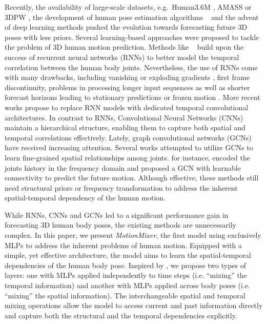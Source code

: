 \documentclass{article}
\begin{document}
Recently, the availability of large-scale datasets, e.g.~Human3.6M \cite{ionescu2013human3}, AMASS \cite{mahmood2019amass} or 3DPW \cite{von2018recovering}, the development of human pose estimation algorithms ~\cite{belagiannis2014holistic,bouazizi2021self} and the advent of deep learning methods pushed the evolution towards forecasting future 3D poses with less priors. Several learning-based approaches were proposed to tackle the problem of 3D human motion prediction. Methods like ~\cite{fragkiadaki2015recurrent,martinez2017human,tang2018long} build upon the success of recurrent neural networks (RNNs) to better model the temporal correlation between the human body joints. Nevertheless, the use of RNNs come with many drawbacks, including vanishing or exploding gradients \cite{fragkiadaki2015recurrent}, first frame discontinuity, problems in processing longer input sequences as well as shorter forecast horizons leading to stationary predictions or frozen motion \cite{martinez2017human}. More recent works \cite{li2018convolutional,sofianos2021space} propose to replace RNN models with dedicated temporal convolutional architectures. In contrast to RNNs, Convolutional Neural Networks (CNNs) maintain a hierarchical structure, enabling them to capture both spatial and temporal correlations effectively. Lately, graph convolutional networks (GCNs) have received increasing attention. Several works \cite{mao2019learning,mao2020history,sofianos2021space,liu2021motion} attempted to utilize GCNs to learn fine-grained spatial relationships among joints.  \cite{mao2019learning} for instance, encoded the joints history in the frequency domain and proposed a GCN with learnable connectivity to predict the future motion. Although effective, these methods still need structural priors \cite{aksan2020spatio} or frequency transformation \cite{mao2019learning} to address the inherent spatial-temporal dependency of the human motion.

While RNNs, CNNs and GCNs led to a significant performance gain in forecasting 3D human body poses, the existing methods are unnecessarily complex. In this paper, we present \textit{MotionMixer}, the first model using exclusively MLPs to address the inherent problems of human motion. Equipped with a simple, yet effective architecture, the model aims to learn the spatial-temporal dependencies of the human body pose. Inspired by \cite{tolstikhin2021mlp}, we propose two types of layers: one with MLPs applied independently to time steps (i.e. “mixing” the temporal information) and another with MLPs applied across body poses (i.e. “mixing” the spatial information). The interchangeable spatial and temporal mixing operations allow the model to access current and past information directly and capture both the structural and the temporal dependencies explicitly.
\end{document}
